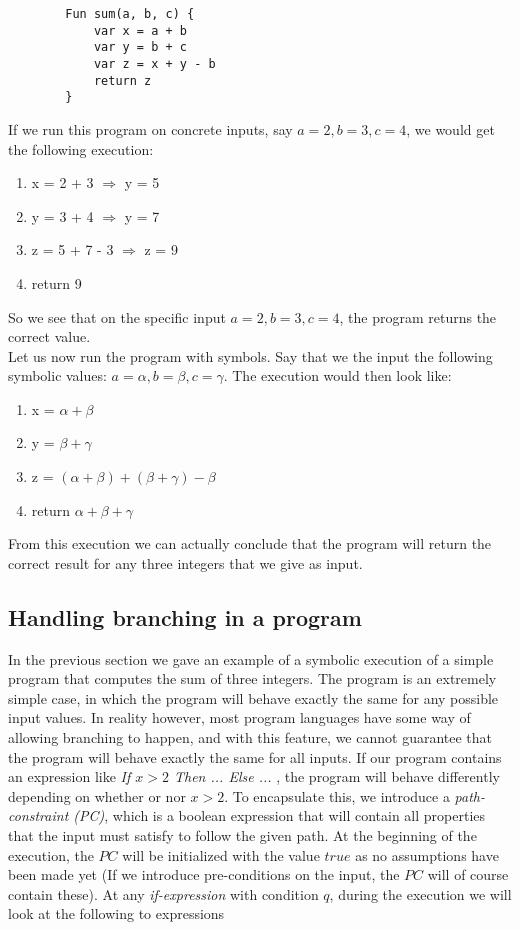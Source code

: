	\begin{verbatim}
		Fun sum(a, b, c) {
			var x = a + b
			var y = b + c
			var z = x + y - b
			return z
		}
	\end{verbatim} 
	
	If we run this program on concrete inputs, say $a = 2, b = 3, c = 4$, we would get the following execution:
	
	\begin{enumerate} 
		\item x = 2 + 3 $\Rightarrow$ y = 5
		\item y = 3 + 4 $\Rightarrow$ y = 7
		\item z = 5 + 7 - 3 $\Rightarrow$ z = 9
		\item return 9
	\end{enumerate}
	
	So we see that on the specific input $a = 2, b = 3, c = 4$, the program returns the correct value.
	\\
	Let us now run the program with symbols. Say that we the input the following symbolic values: $a = \alpha, b = \beta, c = \gamma$.
	The execution would then look like:
	
	\begin{enumerate}
		\item x = $\alpha + \beta$
		\item y = $\beta  + \gamma$
		\item z = $(\alpha + \beta) + (\beta + \gamma) - \beta$
		\item return $\alpha + \beta + \gamma$
	\end{enumerate}
	
	From this execution we can actually conclude that the program will return the correct result for any three integers that we give as input. 
	
	\subsection{Handling branching in a program}
		In the previous section we gave an example of a symbolic execution of a simple program that computes the sum of three integers. The program is an extremely simple case, in which the program will behave exactly the same for any possible input values. In reality however, most program languages have some way of allowing branching to happen, and with this feature, we cannot guarantee that the program will behave exactly the same for all inputs. If our program contains an expression like \emph{If $x > 2$ Then ... Else ... }, the program will behave differently depending on whether or nor $x > 2$. To encapsulate this, we introduce a \emph{path-constraint (PC)}, which is a boolean expression that will contain all properties that the input must satisfy to follow the given path. At the beginning of the execution, the $PC$ will be initialized with the value $true$ as no assumptions have been made yet (If we introduce pre-conditions on the input, the $PC$ will of course contain these). 
		At any \emph{if-expression} with condition $q$, during the execution we will look at the following to expressions
		
